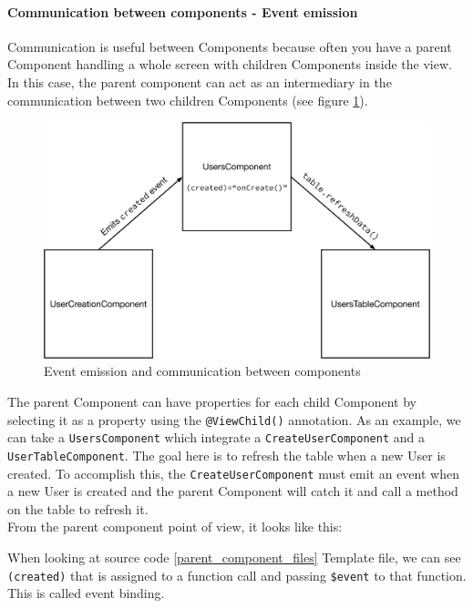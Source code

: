 \documentclass[11pt,a4paper]{report}
\newenvironment{code}{\captionsetup{type=listing}}{}
\begin{document}
\paragraph{Communication between components - Event emission}
\label{communication_components}
Communication is useful between Components because often you have a parent Component handling a whole screen with children Components inside the view. In this case, the parent component can act as an intermediary in the communication between two children Components (see figure \ref{communication_figure}). \\

\begin{figure}[H]
\begin{center}
	\includegraphics[width=.8\textwidth]{assets/componentsComm}
	\caption{Event emission and communication between components}
	\label{communication_figure}
\end{center}
\end{figure}

The parent Component can have properties for each child Component by selecting it as a property using the \verb+@ViewChild()+ annotation. As an example, we can take a \verb+UsersComponent+ which integrate a \verb+CreateUserComponent+ and a \verb+UserTableComponent+. The goal here is to refresh the table when a new User is created. To accomplish this, the \verb+CreateUserComponent+ must emit an event when a new User is created and the parent Component will catch it and call a method on the table to refresh it. \\

From the parent component point of view, it looks like this:
\begin{code}
	\caption{Template and logic files of the parent component}
	\label{parent_component_files}
\end{code}
When looking at source code \ref{parent_component_files} Template file, we can see \verb+(created)+ that is assigned to a function call and passing \verb+$event+ to that function. This is called event binding.\\
\end{document}
